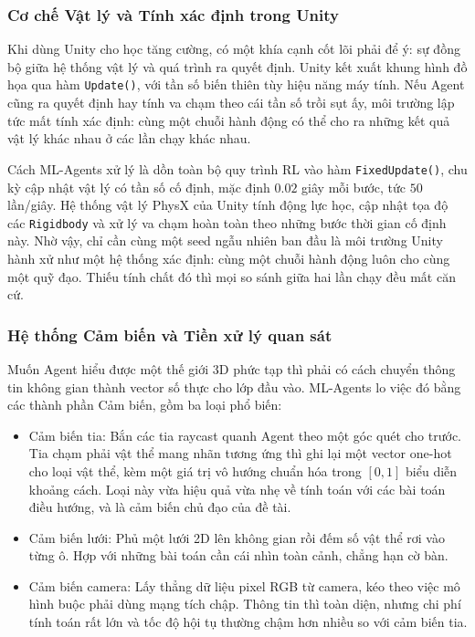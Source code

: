 \subsubsection{Cơ chế Vật lý và Tính xác định trong Unity}
\indent Khi dùng Unity cho học tăng cường, có một khía cạnh cốt lõi phải để ý: sự đồng bộ
giữa hệ thống vật lý và quá trình ra quyết định. Unity kết xuất khung hình đồ họa qua hàm
\texttt{Update()}, với tần số biến thiên tùy hiệu năng máy tính. Nếu Agent cũng ra
quyết định hay tính va chạm theo cái tần số trồi sụt ấy, môi trường lập tức mất tính xác
định: cùng một chuỗi hành động có thể cho ra những kết quả vật lý khác
nhau ở các lần chạy khác nhau.

\indent Cách ML-Agents xử lý là dồn toàn bộ quy trình RL vào hàm \texttt{FixedUpdate()},
chu kỳ cập nhật vật lý có tần số cố định, mặc định $0.02$ giây mỗi bước, tức $50$
lần/giây. Hệ thống vật lý PhysX của Unity tính động lực học, cập nhật tọa độ các
\texttt{Rigidbody} và xử lý va chạm hoàn toàn theo những bước thời
gian cố định này. Nhờ vậy, chỉ cần cùng một seed ngẫu nhiên ban đầu là môi trường Unity
hành xử như một hệ thống xác định: cùng một chuỗi hành động luôn cho cùng một quỹ đạo.
Thiếu tính chất đó thì mọi so sánh giữa hai lần chạy đều mất căn cứ.

\subsubsection{Hệ thống Cảm biến và Tiền xử lý quan sát}
\indent Muốn Agent hiểu được một thế giới 3D phức tạp thì phải có cách chuyển thông tin
không gian thành vector số thực cho lớp đầu vào. ML-Agents lo việc đó bằng các thành phần
Cảm biến, gồm ba loại phổ biến:
\begin{itemize}
    \item Cảm biến tia: Bắn các tia raycast quanh Agent
    theo một góc quét cho trước. Tia chạm phải vật thể mang nhãn tương ứng
    thì ghi lại một vector one-hot cho loại vật thể, kèm một giá trị vô hướng chuẩn hóa
    trong $[0, 1]$ biểu diễn khoảng cách. Loại này vừa hiệu quả vừa nhẹ về tính toán với
    các bài toán điều hướng, và là cảm biến chủ đạo của đề tài.
    \item Cảm biến lưới: Phủ một lưới 2D lên không gian rồi đếm số vật thể rơi vào
    từng ô. Hợp với những bài toán cần cái nhìn toàn cảnh, chẳng hạn cờ bàn.
    \item Cảm biến camera: Lấy thẳng dữ liệu pixel RGB từ camera, kéo theo việc mô
    hình buộc phải dùng mạng tích chập. Thông tin thì toàn diện, nhưng chi phí tính
    toán rất lớn và tốc độ hội tụ thường chậm hơn nhiều so với cảm biến tia.
\end{itemize}

